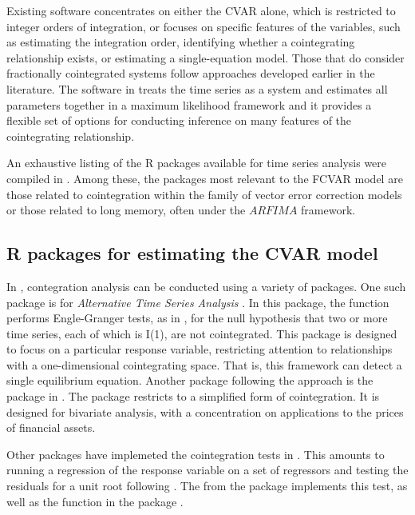 \documentclass[article]{jss}
\newcommand{\fct}[1]{\code{#1()}}
\begin{document}
Existing software concentrates on either the CVAR alone, which is restricted to integer orders of integration, or focuses on specific features of the variables, such as estimating the integration order, identifying whether a  cointegrating relationship exists, or estimating a single-equation model.
Those that do consider fractionally cointegrated systems follow approaches developed earlier in the literature. 
The software in  treats the time series as a system and estimates all parameters together in a maximum likelihood framework and it provides a flexible set of options for conducting inference on many features of the cointegrating relationship. 

% 
An exhaustive listing of the R packages \citep{R} available for time series analysis were compiled in 
\citet{Hyndman2020}.
% 
Among these, the packages most relevant to the FCVAR model are those related to cointegration within the family of vector error correction models or those related to long memory, often under the $ARFIMA$ framework. 

\subsection{R packages for estimating the CVAR model}


In , contegration analysis can be conducted using a variety of packages. 
% 
One such package is  for \emph{Alternative Time Series Analysis} \citep{aTSA2015}. 
In this package, the \fct{coint.test} function performs Engle-Granger tests, as in \citet{EngleGranger1987},  for the null hypothesis that two or more time series, each of which is I(1), are not cointegrated. 
This package is designed to focus on a particular response variable, restricting attention to relationships with a one-dimensional cointegrating space. That is, this framework can detect a single equilibrium equation. 
% 
Another package following the \citet{EngleGranger1987} approach is the  package in \citep{egcm2017}. 
The  package restricts to a simplified form of cointegration. 
It is designed for bivariate analysis, with a concentration on applications to the prices of financial assets.

Other packages have implemeted the cointegration tests in \citet{PhillipsOuliaris1990}. 
This amounts to running a regression of the response variable on a set of regressors and testing the residuals for a unit root following \cite{PhillipsPerron1988}. 
The \fct{po.test} from the  package \citep{tseries2019} implements this test, 
as well as the \fct{ca.po} function in the  package \citep{urca2016}. 
\end{document}

